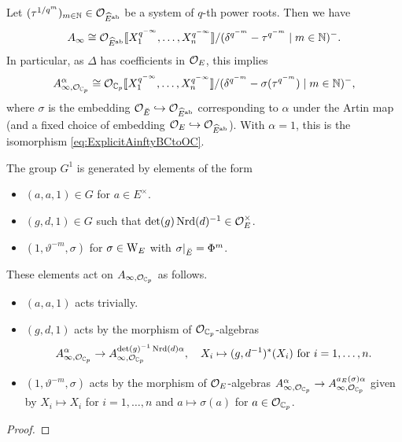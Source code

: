 \documentclass[../main.tex]{subfiles}
\begin{document}
\begin{cor}\label{cor:StructureOfAinfty}
  Let $(\tau^{1/q^m})_{m \in \mathbb{N}} \in \mathcal{O}_{\widehat E^{\mathrm{ab}}}$ be a  system of $q$-th power roots. Then we have 
  \begin{equation*}
    A_\infty \cong \mathcal{O}_{\widehat E^{\mathrm{ab}}}\llbracket X_1^{q^{-\infty}}, \dots,
    X_n^{q^{-\infty}}\rrbracket/(\delta^{q^{-m}} - \tau^{q^{-m}} \mid m \in \mathbb{N})^-.
  \end{equation*}
  In particular, 
  as $\Delta$ has coefficients in $\mathcal{O}_E$, this implies
  \begin{equation*}
    A_{\infty, \mathcal{O}_{\mathbb{C}_p}}^\alpha \cong \mathcal{O}_{{\mathbb{C}_p}}\llbracket X_1^{q^{-\infty}}, \dots,
    X_n^{q^{-\infty}}\rrbracket/(\delta^{q^{-m}} - \sigma(\tau^{q^{-m}}) \mid m \in \mathbb{N})^-,
  \end{equation*}
  where $\sigma$ is the embedding $\mathcal{O}_{\breve {E}} \hookrightarrow \mathcal{O}_{\widehat E^{\mathrm{ab}}}$ corresponding
  to $\alpha$ under the Artin map (and a fixed choice of embedding
  $\mathcal{O}_E \hookrightarrow \mathcal{O}_{\widehat E^{\mathrm{ab}}}$). With $\alpha = 1$, this is the isomorphism
  \eqref{eq:ExplicitAinftyBCtoOC}.
\end{cor}




\begin{prop}\label{prop:ExplicitDescriptionOfActionOnAinfty}
  The group $G^1$ is generated by elements of the form
  \begin{itemize}
    \item $(a, a, 1) \in G$ for $a \in E^\times$.
    \item $(g, d, 1) \in G$ such that $\det(g) \operatorname{Nrd}(d)^{-1} \in \mathcal{O}_E^\times$.
    \item $(1, \vartheta^{-m}, \sigma)$ for $\sigma \in \mathrm W_E$ with
      $\sigma|_{{\breve {E}}} = \Phi^m$. 
  \end{itemize}
  These elements act on $A_{\infty, \mathcal{O}_{\mathbb{C}_p}}$ as follows.
  \begin{itemize}
    \item $(a,a,1)$ acts trivially.
    \item $(g,d,1)$ acts by the morphism of $\mathcal{O}_{\mathbb{C}_p}$-algebras
      $$A_{\infty, \mathcal{O}_{\mathbb{C}_p}}^\alpha \to A_{\infty, \mathcal{O}_{\mathbb{C}_p}}^{\det(g)^{-1} \operatorname{Nrd}(d) \alpha},
    \quad X_i \mapsto (g,d^{-1})^*(X_i) \ \text{for} \ i = 1, \dots,n.$$
    \item $(1, \vartheta^{-m}, \sigma)$ acts by the morphism of $\mathcal{O}_E$-algebras 
      $A_{\infty, \mathcal{O}_{\mathbb{C}_p}}^\alpha \to A_{\infty, \mathcal{O}_{\mathbb{C}_p}}^{a_E(\sigma)\alpha}$
      given by $X_i \mapsto X_i$ for $i = 1, \dots, n$ and $a \mapsto
      \sigma(a)$ for $a \in \mathcal{O}_{\mathbb{C}_p}$.
  \end{itemize}
\begin{proof}
\end{proof}
\end{prop}
\end{document}
